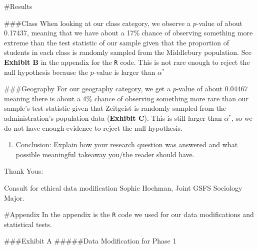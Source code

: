 \documentclass[
]{article}
\providecommand{\tightlist}{%
  \setlength{\itemsep}{0pt}\setlength{\parskip}{0pt}}
\begin{document}
\#Results

\#\#\#Class When looking at our class category, we observe a \(p\)-value
of about 0.17437, meaning that we have about a 17\% chance of observing
something more extreme than the test statistic of our sample given that
the proportion of students in each class is randomly sampled from the
Middlebury population. See \textbf{Exhibit B} in the appendix for the
\texttt{R} code. This is not rare enough to reject the null hypothesis
because the \(p\)-value is larger than \(\alpha^*\)

\#\#\#Geography For our geography category, we get a \(p\)-value of
about 0.04467 meaning there is about a 4\% chance of observing something
more rare than our sample's test statistic given that Zeitgeist is
randomly sampled from the administration's population data
(\textbf{Exhibit C}). This is still larger than \(\alpha^*\), so we do
not have enough evidence to reject the null hypothesis.

\begin{enumerate}
\def\labelenumi{\arabic{enumi})}
\setcounter{enumi}{3}
\tightlist
\item
  Conclusion: Explain how your research question was answered and what
  possible meaningful takeaway you/the reader should have.
\end{enumerate}

Thank Yous:

Consult for ethical data modification Sophie Hochman, Joint GSFS
Sociology Major.

\#Appendix In the appendix is the \texttt{R} code we used for our data
modifications and statistical tests.

\#\#\#Exhibit A \#\#\#\#\#Data Modification for Phase 1
\end{document}
